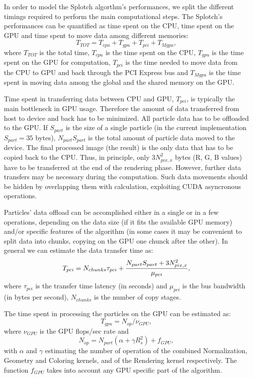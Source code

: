 \documentclass[11pt]{article}
\begin{document}
In order to model the Splotch algorthm's performances, we split the different timings
required to perform the main computational steps. 
The Splotch's performances can be quantified as time spent on the CPU, time spent on the GPU
and time spent to move data among different memories:
\begin{equation}\label{Ts}
T_{TOT} = T_{cpu} + T_{gpu} + T_{pci} + T_{Mgpu},
\end{equation}
where $T_{TOT}$ is the total time, 
$T_{cpu}$ is the time spent on the CPU, $T_{gpu}$ is the time
spent on the GPU for computation, $T_{pci}$ is the time needed to move data from
the CPU to GPU and back through the PCI Express bus and $T_{Mgpu}$ is the time 
spent in moving data among the global and the shared memory on the GPU.

Time spent in transferring data
between CPU and GPU, $T_{pci}$, is typically the main 
bottleneck in GPU usage. Therefore the amount of data transferred from host
to device and back has to be minimized. 
All particle data has to be offloaded to the GPU. If $S_{part}$ is the
size of a single particle (in the current implementation $S_{part}=35$ bytes),
$N_{part} S_{part}$ is the total amount of particle data moved to the device.
The final processed image (the result) is the only data that has to be copied back to
the CPU. Thus, in principle, only $3 N_{pix,x}^2$ bytes (R, G, B values) have to be transferred at
the end of the rendering phase. However, further data transfers may be necessary
during the computation. Such data movements should be hidden
by overlapping them with calculation, exploiting CUDA asyncronous operations.

Particles' data offload can be accomplished either in a single or in a few operations, 
depending on the data size (if it fits the available GPU memory) and/or
specific features of the algorithm (in some cases it may be convenient to
split data into chunks, copying on the GPU one chunck after the other).
In general we can estimate the data transfer time as:
\begin{equation}\label{pci}
T_{pci} =  N_{chunks} \tau_{pci} + {N_{part} S_{part} + 3 N_{pix,x}^2 \over 
\mu_{pci}},
\end{equation}
where $\tau_{pci}$ is the transfer time latency (in seconds) and $\mu_{pci}$ is the
bus bandwidth (in bytes per second), $N_{chunks}$ is the number 
of copy stages. 

The time spent in processing the particles on the GPU can be estimated as:
\begin{equation}
T_{gpu} = N_{op}/\nu_{GPU},
\end{equation}
where $\nu_{GPU}$ is the GPU flops/sec rate and
\begin{equation}\label{ops}
N_{op} = N_{part}(\alpha + \gamma R_s^2) + f_{GPU},
\end{equation}
with $\alpha$ and $\gamma$ estimating the number of operation of 
the combined Normalization, Geometry and Coloring kernels,  
and of the Rendering kernel respectively. The function 
$f_{GPU}$ takes into account any GPU specific part of the algorithm. 
\end{document}
